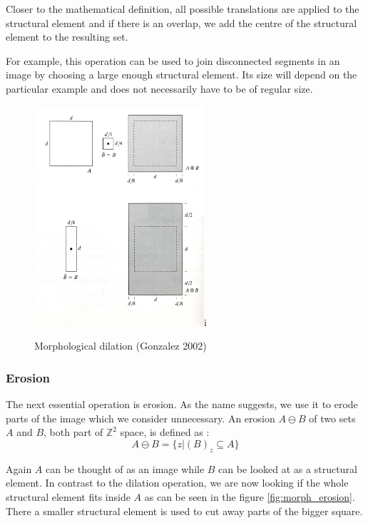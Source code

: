\documentclass[
  digital,     %
  oneside,     %
  nosansbold,  %
  nocolorbold, %
  lof,         %
  lot,         %
]{fithesis4}
\newcommand*{\Z}{\ensuremath{\mathbb{Z}}}
\begin{document}
Closer to the mathematical definition, all possible translations are applied to the structural element and if there is an overlap, we add the centre of the structural element to the resulting set.

For example, this operation can be used to join disconnected segments in an
image by choosing a large enough structural element. Its size will depend on the
particular example and does not necessarily have to be of regular size.

\begin{figure}
    \begin{center}
        \includegraphics[width=6.3cm]{resources/morph_dilation.jpg}i
    \end{center}
    \caption{Morphological dilation (Gonzalez 2002)} %
    \label{fig:morph_dilation}
\end{figure}

\subsubsection{Erosion}

The next essential operation is erosion. As the name suggests, we use it to erode
parts of the image which we consider unnecessary. An erosion $A \ominus B$ of
two sets $A$ and $B$, both part of $\Z^2$ space, is defined as
\parencite{gonzalez2002}:
$$A \ominus B = \{z | (B)_z \subseteq A\}$$

Again $A$ can be thought of as an image while $B$ can be looked at as a structural
element. In contrast to the dilation operation, we are now looking if the whole
structural element fits inside $A$ as can be seen in the figure
\ref{fig:morph_erosion}. There a smaller structural element is used to cut away
parts of the bigger square.
\end{document}
